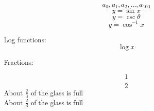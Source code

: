 \documentclass[12pt]{article}
\begin{document}
$${a_{0}, a_{1}, a_{2}, \ldots, a_{100}}$$
$${y=\sin{x}}$$
$${y=\csc{\theta}}$$
$${y=\cos^{-1}{x}}$$

Log functions:
$${\log{x}}$$

Fractions:

$${\frac{1}{2}}$$
About $\displaystyle \frac{2}{3}$ of the glass is full \\[12pt]
About $\frac{2}{3}$ of the glass is full
\end{document}
